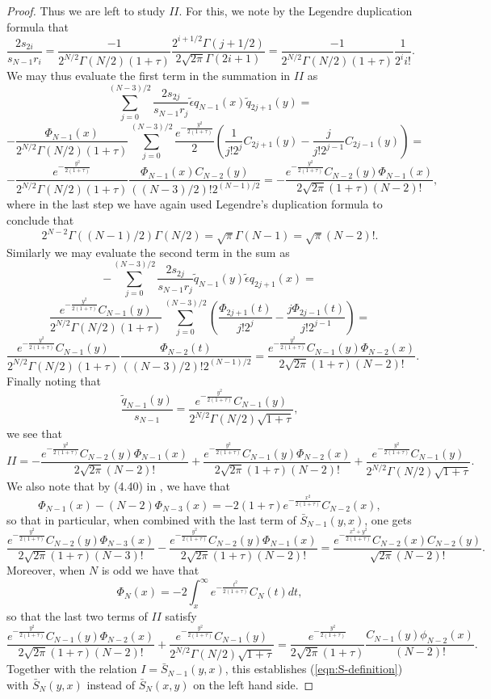 \documentclass[12pt]{article}
\numberwithin{info}{section}
\numberwithin{equation}{section}
\renewcommand{\[}{\begin{equation}}
\renewcommand{\]}{\end{equation}}
\newcommand{\sq}{\sqrt}
\newcommand{\<}{\langle}
\renewcommand{\>}{\rangle}
\renewcommand{\sq}{\sqrt}
\begin{document}
\begin{proof}
		Thus we are left to study $II$. For this, we note by the Legendre duplication formula that
		\[\frac{2s_{2i}}{s_{N-1}r_i}=\frac{-1}{2^{N/2}\Gamma(N/2)(1+\tau)}\frac{2^{i+1/2}\Gamma(j+1/2)}{2\sqrt{2\pi}\Gamma(2i+1)}=\frac{-1}{2^{N/2}\Gamma(N/2)(1+\tau)}\frac{1}{2^{i}{i!}}.\]
		We may thus evaluate the first term in the summation in $II$ as
		\[\sum_{j=0}^{(N-3)/2}\frac{2s_{2j}}{s_{N-1}r_j}\tilde{\epsilon}q_{N-1}(x)\tilde{q}_{2j+1}(y)=\]
		\[-\frac{\Phi_{N-1}(x)}{2^{N/2}\Gamma(N/2)(1+\tau)}\sum_{j=0}^{(N-3)/2}\frac{e^{-\frac{y^2}{2(1+\tau)}}}{2}\left(\frac{1}{j!2^j}C_{2j+1}(y)-\frac{j}{j!2^{j-1}}C_{2j-1}(y)\right)=\]
		\[-\frac{e^{-\frac{y^2}{2(1+\tau)}}}{2^{N/2}\Gamma(N/2)(1+\tau)}\frac{\Phi_{N-1}(x)C_{N-2}(y)}{((N-3)/2)!2^{(N-1)/2}}=-\frac{e^{-\frac{y^2}{2(1+\tau)}}C_{N-2}(y)\Phi_{N-1}(x)}{2\sqrt{2\pi}(1+\tau)(N-2)!},\]
		where in the last step we have again used Legendre's duplication formula to conclude that
		\[
		2^{N-2}\Gamma((N-1)/2)\Gamma(N/2)=\sqrt{\pi}\Gamma(N-1)=\sqrt{\pi}(N-2)!.
		\]
		Similarly we may evaluate the second term in the sum as
		\[-\sum_{j=0}^{(N-3)/2}\frac{2s_{2j}}{s_{N-1}r_j}\tilde{q}_{N-1}(y)\tilde{\epsilon}q_{2j+1}(x)=\]
		\[\frac{e^{-\frac{y^2}{2(1+\tau)}}C_{N-1}(y)}{2^{N/2}\Gamma(N/2)(1+\tau)}\sum_{j=0}^{(N-3)/2}\left(\frac{\Phi_{2j+1}(t)}{j!2^j}-\frac{j\Phi_{2j-1}(t)}{j!2^{j-1}}\right)=\]
		\[\frac{e^{-\frac{y^2}{2(1+\tau)}}C_{N-1}(y)}{2^{N/2}\Gamma(N/2)(1+\tau)}\frac{\Phi_{N-2}(t)}{((N-3)/2)!2^{(N-1)/2}}=\frac{e^{-\frac{y^2}{2(1+\tau)}}C_{N-1}(y)\Phi_{N-2}(x)}{2\sqrt{2\pi}(1+\tau)(N-2)!}.\]
		Finally noting that	\[\frac{\tilde{q}_{N-1}(y)}{s_{N-1}}=\frac{e^{-\frac{y^2}{2(1+\tau)}}C_{N-1}(y)}{2^{N/2}\Gamma(N/2)\sqrt{1+\tau}},\]
		we see that 
		\[II=-\frac{e^{-\frac{y^2}{2(1+\tau)}}C_{N-2}(y)\Phi_{N-1}(x)}{2\sqrt{2\pi}(N-2)!}+\frac{e^{-\frac{y^2}{2(1+\tau)}}C_{N-1}(y)\Phi_{N-2}(x)}{2\sqrt{2\pi}(1+\tau)(N-2)!}+\frac{e^{-\frac{y^2}{2(1+\tau)}}C_{N-1}(y)}{2^{N/2}\Gamma(N/2)\sqrt{1+\tau}}.\]
		We also note that by (4.40) in \cite{forrester-elliptic}, we have that
		\[\Phi_{N-1}(x)-(N-2)\Phi_{N-3}(x)=-2(1+\tau)e^{-\frac{x^2}{2(1+\tau)}}C_{N-2}(x),\]
		so that in particular, when combined with the last term of $\bar{S}_{N-1}(y,x)$, one gets
		\[\frac{e^{-\frac{y^2}{2(1+\tau)}}C_{N-2}(y)\Phi_{N-3}(x)}{2\sq{2\pi}(1+\tau)(N-3)!}-\frac{e^{-\frac{y^2}{2(1+\tau)}}C_{N-2}(y)\Phi_{N-1}(x)}{2\sqrt{2\pi}(1+\tau)(N-2)!}=\frac{e^{-\frac{x^2+y^2}{2(1+\tau)}}C_{N-2}(x)C_{N-2}(y)}{\sqrt{2\pi}(N-2)!}.\]
		Moreover, when $N$ is odd we have that
		\[\Phi_{N}(x)=-2\int_{x}^\infty e^{-\frac{t^2}{2(1+\tau)}}C_N(t)dt,\]
		so that the last two terms of $II$ satisfy
		\[\frac{e^{-\frac{y^2}{2(1+\tau)}}C_{N-1}(y)\Phi_{N-2}(x)}{2\sqrt{2\pi}(1+\tau)(N-2)!}+\frac{e^{-\frac{y^2}{2(1+\tau)}}C_{N-1}(y)}{2^{N/2}\Gamma(N/2)\sqrt{1+\tau}}=\frac{e^{-\frac{y^2}{2(1+\tau)}}}{2\sq{2\pi}(1+\tau)}\frac{C_{N-1}(y)\phi_{N-2}(x)}{(N-2)!}.\]
		Together with the relation $I=\bar{S}_{N-1}(y,x)$, this establishes (\ref{eqn:S-definition}) with $\bar{S}_N(y,x)$ instead of $\bar{S}_N(x,y)$ on the left hand side. 
		

\end{proof}
\end{document}
